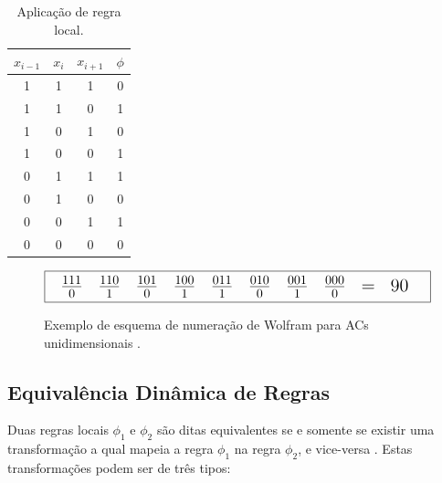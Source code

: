 \documentclass[12pt,a4paper]{article}
\begin{document}
\begin{table}[htp]
\begin{center}
\begin{tabular}{|c|c|c|c|}
\hline
\Large $x_{i-1}$ & \Large $x_i$ & \Large $x_{i+1}$ & \Large $\phi$ \\ \hline
1 & 1 & 1 & 0 \\ \hline
1 & 1 & 0 & 1 \\ \hline
1 & 0 & 1 & 0 \\ \hline
1 & 0 & 0 & 1 \\ \hline
0 & 1 & 1 & 1 \\ \hline
0 & 1 & 0 & 0 \\ \hline
0 & 0 & 1 & 1 \\ \hline
0 & 0 & 0 & 0 \\ \hline
\end{tabular}
\caption{Aplicação de regra local.}
\label{tab:localrule}
\end{center}
\end{table}

\begin{figure}[htp]
\begin{center}
\[ \fbox {
{\Large
\begin{tabular}{c c c c c c c c c c c}
$\frac{1 1 1}{0}$ & $\frac{1 1 0}{1}$ & $\frac{1 0 1}{0}$ & $\frac{1 0 0}{1}$ & 
$\frac{0 1 1}{1}$ & $\frac{0 1 0}{0}$ & $\frac{0 0 1}{1}$ & $\frac{0 0 0}{0}$ &
= & 90
\end{tabular}
}
} \]
\caption{Exemplo de esquema de numeração de Wolfram para ACs unidimensionais
.}
\label{fig:celnumbering}
\end{center}
\end{figure}

\subsection{Equivalência Dinâmica de Regras}

Duas regras locais ${\phi}_1$ e ${\phi}_2$ são ditas equivalentes se e somente se existir
uma transformação a qual mapeia a regra ${\phi}_1$ na regra ${\phi}_2$, e vice-versa
. Estas transformações podem ser de três tipos:
\end{document}
